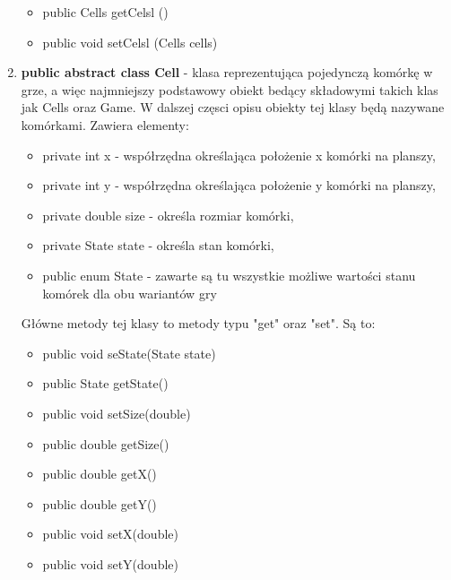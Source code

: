 \documentclass[10pt, oneside]{article}
\begin{document}
\begin{enumerate}
\begin {enumerate}
\begin{itemize}
	\item public  Cells getCelsl ()
	\item public  void setCelsl (Cells cells) 

	\end{itemize}
\end {enumerate}

	
\item  \textbf{public abstract class Cell} - klasa reprezentująca pojedynczą komórkę w  grze, a więc najmniejszy podstawowy obiekt bedący składowymi takich klas jak Cells oraz Game. W dalszej częsci opisu obiekty tej klasy będą nazywane komórkami. Zawiera elementy:
	\begin {itemize}
	\item private  int x - współrzędna określająca położenie x komórki na planszy,
	\item private  int y - współrzędna określająca położenie y komórki na planszy,
	\item private double size - określa rozmiar komórki,
	\item private  State state - określa stan komórki, 
	\item public enum State - zawarte są tu wszystkie możliwe wartości stanu komórek dla obu wariantów gry
	\end {itemize}

Główne metody tej klasy to metody typu "get" oraz "set". Są  to:

	\begin {itemize}
	\item public void seState(State state)
	\item public State getState()
	\item public void setSize(double)
	\item public double getSize()
	\item public double getX()
	\item public double getY()
	\item public void setX(double)
	\item public void setY(double)
	\end {itemize}



\end{enumerate}
\end{document}

